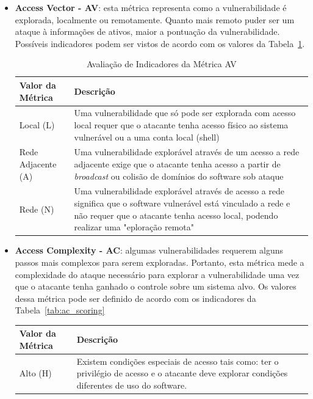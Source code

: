 \begin{itemize}
\item \textbf{Access Vector - AV}: esta métrica representa como a vulnerabilidade é explorada, localmente ou remotamente. Quanto mais remoto puder ser um ataque à informações de ativos, maior a pontuação da vulnerabilidade. Possíveis indicadores podem ser vistos  de acordo com os valores da Tabela~\ref{tab:av_scoring}.
	\begin{table}[H]
	\begin{center}
	    \begin{tabular}{ | l | p{10cm} |}
	    \hline
	    Valor da Métrica & Descrição \\ \hline
	    Local (L) & Uma vulnerabilidade que só pode ser explorada com acesso local requer que o atacante tenha acesso físico ao sistema vulnerável ou a uma conta local (shell) \\ \hline
	    Rede Adjacente (A) & Uma vulnerabilidade explorável através de um acesso a rede adjacente exige que o atacante tenha acesso a partir de \emph{broadcast} ou colisão de domínios do software sob ataque \\ \hline
	    Rede (N) & Uma vulnerabilidade explorável através de acesso a rede significa que o software vulnerável está vinculado a rede e não requer que o atacante tenha acesso local, podendo realizar uma "eploração remota" \\ \hline
	    \end{tabular}
	    \caption{Avaliação de Indicadores da Métrica AV}
	    \label{tab:av_scoring}
	\end{center}
	\end{table}
\item \textbf{Access Complexity - AC}: algumas vulnerabilidades requerem alguns passos mais complexos para serem exploradas. Portanto, esta métrica mede a complexidade do ataque necessário para explorar a vulnerabilidade uma vez que o atacante tenha ganhado o controle sobre um sistema alvo. Os valores dessa métrica pode ser definido de acordo com os indicadores da Tabela~\ref{tab:ac_scoring}
	\begin{table}[H]
	\begin{center}
	    \begin{tabular}{ | l | p{10cm} |}
	    \hline
	    Valor da Métrica & Descrição \\ \hline
	    Alto (H) & Existem condições especiais de acesso tais como: ter o privilégio de acesso e o atacante deve explorar condições diferentes de uso do software. \\ \hline

\end{tabular}
\end{center}
\end{table}
\end{itemize}
